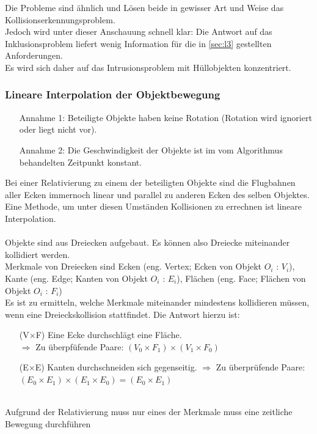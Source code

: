 Die Probleme sind ähnlich und Lösen beide in gewisser Art und Weise das Kollisionserkennungsproblem.\\
Jedoch wird unter dieser Anschauung schnell klar: Die Antwort auf das Inklusionsproblem liefert wenig Information für die in \ref{sec:l3} gestellten Anforderungen.\\
Es wird sich daher auf das Intrusionsproblem mit Hüllobjekten konzentriert.


\subsubsection{Lineare Interpolation der Objektbewegung}
\begin{itemize}
\item[Annahme 1:] Beteiligte Objekte haben keine Rotation (Rotation wird ignoriert oder liegt nicht vor).
\item[Annahme 2:] Die Geschwindigkeit der Objekte ist im vom Algorithmus behandelten Zeitpunkt konstant.
\end{itemize}
Bei einer Relativierung zu einem der beteiligten Objekte sind die Flugbahnen aller Ecken immernoch linear und parallel zu anderen Ecken des selben Objektes.\\
Eine Methode, um unter diesen Umständen Kollisionen zu errechnen ist lineare Interpolation.\\
\\
Objekte sind aus Dreiecken aufgebaut. Es können also Dreiecke miteinander kollidiert werden.\\
		Merkmale von Dreiecken sind Ecken (eng. Vertex; Ecken von Objekt $O_i$ : $V_i$), Kante (eng. Edge; Kanten von Objekt $O_i$ : $E_i$), Flächen (eng. Face; Flächen von Objekt $O_i$ : $F_i$)\\
		Es ist zu ermitteln, welche Merkmale miteinander mindestens kollidieren müssen, wenn eine Dreieckskollision stattfindet. Die Antwort hierzu ist:
		\begin{itemize}
			\item [(V$\times$F)] Eine Ecke durchschlägt eine Fläche.\\
				$\Rightarrow$ Zu überpfüfende Paare: $(V_0\times F_1)\times (V_1\times F_0)$
			\item [(E$\times$E)] Kanten durchschneiden sich gegenseitig.
				$\Rightarrow$ Zu überprüfende Paare: $(E_0\times E_1)\times (E_1\times E_0) = (E_0\times E_1)$
		\end{itemize}
\ \\
		Aufgrund der Relativierung muss nur eines der Merkmale muss eine zeitliche Bewegung durchführen
